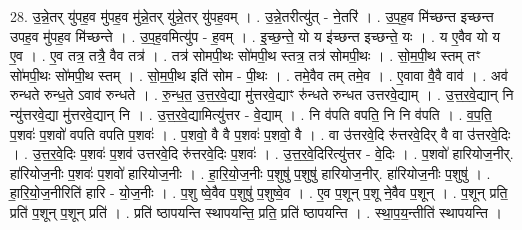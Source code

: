 \documentclass[17pt]{extarticle}
\begin{document}
28. उ॒न्ने॒तर् यु॑पह॒व मु॑पह॒व मु॑न्ने॒तर् यु॑न्ने॒तर् यु॑पह॒वम् । . उ॒न्ने॒तरीत्यु॑त् - ने॒तरि॑ । . उ॒प॒ह॒व मि॑च्छन्त इच्छन्त उपह॒व मु॑पह॒व मि॑च्छन्ते । . उ॒प॒ह॒वमित्यु॑प - ह॒वम् । . इ॒च्छ॒न्ते॒ यो य इ॑च्छन्त इच्छन्ते॒ यः । . य ए॒वैव यो य ए॒व । . ए॒व तत्र॒ तत्रै॒ वैव तत्र॑ । . तत्र॑ सोमपी॒थः सो॑मपी॒थ स्तत्र॒ तत्र॑ सोमपी॒थः । . सो॒म॒पी॒थ स्तम् तꣳ सो॑मपी॒थः सो॑मपी॒थ स्तम् । . सो॒म॒पी॒थ इति॑ सोम - पी॒थः । . तमे॒वैव तम् तमे॒व । . ए॒वावा वै॒वै वाव॑ । . अव॑ रुन्धते रुन्ध॒ते ऽवाव॑ रुन्धते । . रु॒न्ध॒त॒ उ॒त्त॒र॒वे॒द्या मु॑त्तरवे॒द्याꣳ रु॑न्धते रुन्धत उत्तरवे॒द्याम् । . उ॒त्त॒र॒वे॒द्यान् नि न्यु॑त्तरवे॒द्या मु॑त्तरवे॒द्यान् नि । . उ॒त्त॒र॒वे॒द्यामित्यु॑त्तर - वे॒द्याम् । . नि व॑पति वपति॒ नि नि व॑पति । . व॒प॒ति॒ प॒शवः॑ प॒शवो॑ वपति वपति प॒शवः॑ । . प॒शवो॒ वै वै प॒शवः॑ प॒शवो॒ वै । . वा उ॑त्तरवे॒दि रु॑त्तरवे॒दिर् वै वा उ॑त्तरवे॒दिः । . उ॒त्त॒र॒वे॒दिः प॒शवः॑ प॒शव॑ उत्तरवे॒दि रु॑त्तरवे॒दिः प॒शवः॑ । . उ॒त्त॒र॒वे॒दिरित्यु॑त्तर - वे॒दिः । . प॒शवो॑ हारियोज॒नीर्. हा॑रियोज॒नीः प॒शवः॑ प॒शवो॑ हारियोज॒नीः । . हा॒रि॒यो॒ज॒नीः प॒शुषु॑ प॒शुषु॑ हारियोज॒नीर्. हा॑रियोज॒नीः प॒शुषु॑ । . हा॒रि॒यो॒ज॒नीरिति॑ हारि - यो॒ज॒नीः । . प॒शु ष्वे॒वैव प॒शुषु॑ प॒शुष्वे॒व । . ए॒व प॒शून् प॒शू ने॒वैव प॒शून् । . प॒शून् प्रति॒ प्रति॑ प॒शून् प॒शून् प्रति॑ । . प्रति॑ ष्ठापयन्ति स्थापयन्ति॒ प्रति॒ प्रति॑ ष्ठापयन्ति । . स्था॒प॒य॒न्तीति॑ स्थापयन्ति । \newline
\end{document}
